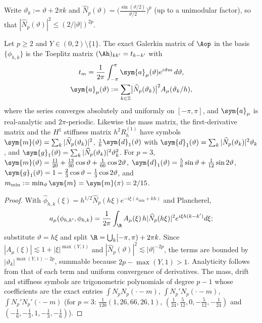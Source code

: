 Write $\vartheta_k:=\vartheta+2\pi k$ and
$\widehat N_p(\vartheta)=\bigl(\tfrac{\sin(\vartheta/2)}{\vartheta/2}\bigr)^p$
(up to a unimodular factor), so that $|\widehat N_p(\vartheta)|^2\le(2/|\vartheta|)^{2p}$.
\begin{lemma}\label{lem:periodisation}
Let $p\ge2$ and $Y\in(0,2)\setminus\{1\}$.  The exact Galerkin matrix of
$\Aop$ in the basis $\{\phi_{h,k}\}$ is the Toeplitz matrix
$(\Ah)_{kk'}=t_{k-k'}$ with
\begin{equation}
\begin{gathered}
 t_m=\frac1{2\pi}\int_{-\pi}^{\pi}\sym{a}_\mu(\vartheta)e^{i\vartheta m}\,d\vartheta,
 \\
 \sym{a}_\mu(\vartheta):=\sum_{k\in\mathbb Z}\bigl|\widehat N_p(\vartheta_k)\bigr|^2A_\mu(\vartheta_k/h),
\end{gathered}
 \label{eq:periodised}
\end{equation}
where the series converges absolutely and uniformly on $[-\pi,\pi]$, and
$\sym{a}_\mu$ is real-analytic and $2\pi$-periodic.  Likewise the mass matrix,
the first-derivative matrix and the $H^1$ stiffness matrix $h^2R^{(1)}_h$
have symbols
$\sym{m}(\vartheta)=\sum_k|\widehat N_p(\vartheta_k)|^2$,
$\tfrac{i}{h}\sym{d}_1(\vartheta)$ with $\sym{d}_1(\vartheta)=\sum_k|\widehat N_p(\vartheta_k)|^2\vartheta_k$,
and $\sym{g}_1(\vartheta)=\sum_k|\widehat N_p(\vartheta_k)|^2\vartheta_k^2$.
For $p=3$,
$\sym{m}(\vartheta)=\tfrac{11}{20}+\tfrac{13}{30}\cos\vartheta+\tfrac1{60}\cos2\vartheta$,
$\sym{d}_1(\vartheta)=\tfrac56\sin\vartheta+\tfrac1{12}\sin2\vartheta$,
$\sym{g}_1(\vartheta)=1-\tfrac23\cos\vartheta-\tfrac13\cos2\vartheta$,
and $m_{\min}:=\min_\vartheta \sym{m}=\sym{m}(\pi)=2/15$.
\end{lemma}
\begin{proof}
With $\widehat\phi_{h,k}(\xi)=h^{1/2}\widehat N_p(h\xi)e^{-i\xi(x_{\min}+kh)}$ and
Plancherel,
\[
a_\mu(\phi_{h,k'},\phi_{h,k})=\frac1{2\pi}\int_\R A_\mu(\xi)\,h|\widehat N_p(h\xi)|^2e^{i\xi h(k-k')}d\xi;
\]
substitute $\vartheta=h\xi$ and split $\R=\bigcup_k[-\pi,\pi)+2\pi k$.  Since
$|A_\mu(\xi)|\lesssim 1+|\xi|^{\max(Y,1)}$ and $|\widehat N_p(\vartheta)|^2\lesssim|\vartheta|^{-2p}$,
the terms are bounded by $|\vartheta_k|^{\max(Y,1)-2p}$, summable because
$2p-\max(Y,1)>1$.  Analyticity follows from that of each term and uniform
convergence of derivatives.  The mass, drift and stiffness symbols are
trigonometric polynomials of degree $p-1$ whose coefficients are the exact
entries $\int N_pN_p(\cdot-m)$, $\int N_p'N_p(\cdot-m)$, $\int N_p'N_p'(\cdot-m)$
(for $p=3$: $\tfrac1{120}(1,26,66,26,1)$, $(\tfrac1{24},\tfrac5{12},0,-\tfrac5{12},-\tfrac1{24})$
and $(-\tfrac16,-\tfrac13,1,-\tfrac13,-\tfrac16)$).
\end{proof}
